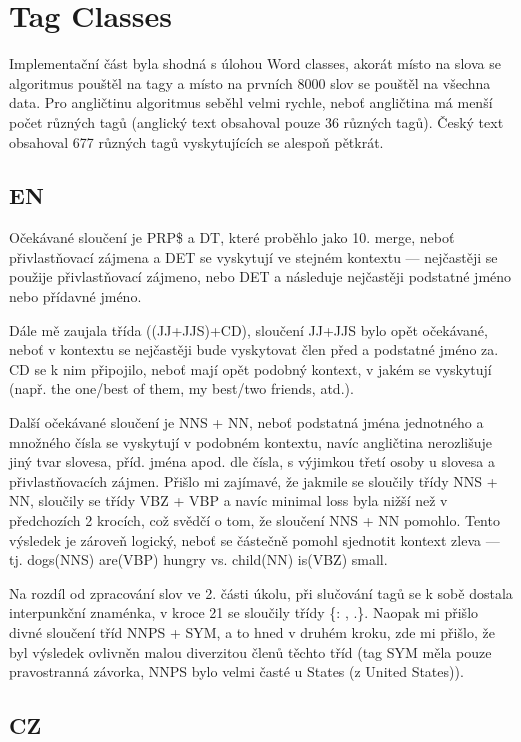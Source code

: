 \documentclass[12pt, a4paper]{report}
\theoremstyle{remark}
\begin{document}
\section*{Tag Classes}
Implementační část byla shodná s úlohou Word classes, akorát místo na slova se algoritmus pouštěl na tagy a místo na prvních 8000 slov se pouštěl na všechna data. Pro angličtinu algoritmus seběhl velmi rychle, neboť angličtina má menší počet různých tagů (anglický text obsahoval pouze 36 různých tagů). Český text obsahoval 677 různých tagů vyskytujících se alespoň pětkrát.

\subsection*{EN}
Očekávané sloučení je PRP\$ a DT, které proběhlo jako 10. merge, neboť přivlastňovací zájmena a DET se vyskytují ve stejném kontextu --- nejčastěji se použije přivlastňovací zájmeno, nebo DET a následuje nejčastěji podstatné jméno nebo přídavné jméno. 


Dále mě zaujala třída ((JJ+JJS)+CD), sloučení JJ+JJS bylo opět očekávané, neboť v kontextu se nejčastěji bude vyskytovat člen před a podstatné jméno za. CD se k nim připojilo, neboť mají opět podobný kontext, v jakém se vyskytují (např. the one/best of them, my best/two friends, atd.).

Další očekávané sloučení je NNS + NN, neboť podstatná jména jednotného a množného čísla se vyskytují v podobném kontextu, navíc angličtina nerozlišuje jiný tvar slovesa, příd. jména apod. dle čísla, s výjimkou třetí osoby u slovesa a přivlastňovacích zájmen. Přišlo mi zajímavé, že jakmile se sloučily třídy NNS + NN, sloučily se třídy VBZ + VBP a navíc minimal loss byla nižší než v předchozích 2 krocích, což svědčí o tom, že sloučení NNS + NN pomohlo. Tento výsledek je zároveň logický, neboť se částečně pomohl sjednotit kontext zleva --- tj. dogs(NNS) are(VBP) hungry vs. child(NN) is(VBZ) small. 

Na rozdíl od zpracování slov ve 2. části úkolu, při slučování tagů se k sobě dostala interpunkční znaménka, v kroce 21 se sloučily třídy \{{: , .}\}.
Naopak mi přišlo divné sloučení tříd NNPS + SYM, a to hned v druhém kroku, zde mi přišlo, že byl výsledek ovlivněn malou diverzitou členů těchto tříd (tag SYM měla pouze pravostranná závorka, NNPS bylo velmi časté u States (z United States)).

\subsection*{CZ}
\end{document}
